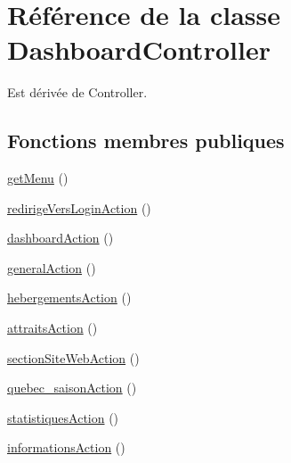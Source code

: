 \hypertarget{class_my_app_1_1_admin_bundle_1_1_controller_1_1_dashboard_controller}{\section{Référence de la classe Dashboard\-Controller}
\label{class_my_app_1_1_admin_bundle_1_1_controller_1_1_dashboard_controller}
}


Est dérivée de Controller.

\subsection*{Fonctions membres publiques}
\begin{DoxyCompactItemize}
\item 
\hyperlink{class_my_app_1_1_admin_bundle_1_1_controller_1_1_dashboard_controller_a637e84e2e9e99a87ea9b5f1771551af4}{get\-Menu} ()
\item 
\hyperlink{class_my_app_1_1_admin_bundle_1_1_controller_1_1_dashboard_controller_a485b84f859f1598b06e268cd25dbd1ef}{redirige\-Vers\-Login\-Action} ()
\item 
\hyperlink{class_my_app_1_1_admin_bundle_1_1_controller_1_1_dashboard_controller_a284cccbe1f8c1df6d3fead99c74209e2}{dashboard\-Action} ()
\item 
\hyperlink{class_my_app_1_1_admin_bundle_1_1_controller_1_1_dashboard_controller_ac9b012d9e0102199c4fd19ad05a5543d}{general\-Action} ()
\item 
\hyperlink{class_my_app_1_1_admin_bundle_1_1_controller_1_1_dashboard_controller_a6e002cf793715095b889abee0fee440b}{hebergements\-Action} ()
\item 
\hyperlink{class_my_app_1_1_admin_bundle_1_1_controller_1_1_dashboard_controller_a5db80fcf0c13ae3044a8cfb33fb01897}{attraits\-Action} ()
\item 
\hyperlink{class_my_app_1_1_admin_bundle_1_1_controller_1_1_dashboard_controller_a828e3c42eb0790a0218477b72c339e83}{section\-Site\-Web\-Action} ()
\item 
\hyperlink{class_my_app_1_1_admin_bundle_1_1_controller_1_1_dashboard_controller_a50c7f342838eeda828cea9f4a24e10db}{quebec\-\_\-saison\-Action} ()
\item 
\hyperlink{class_my_app_1_1_admin_bundle_1_1_controller_1_1_dashboard_controller_a1e5eeb905e3bd8863fd510d9fd21d6f4}{statistiques\-Action} ()
\item 
\hyperlink{class_my_app_1_1_admin_bundle_1_1_controller_1_1_dashboard_controller_a7fcbd338a27238488b4095f6b878534a}{informations\-Action} ()
\end{DoxyCompactItemize}


